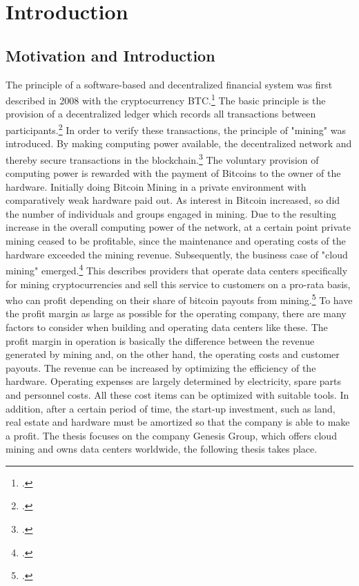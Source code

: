 \section{Introduction} \label{toc:einleitung}

\subsection{Motivation and Introduction} \label{toc:motivation}

The principle of a software-based and decentralized financial system was first described in 2008 with the cryptocurrency \ac{BTC}.\footcite[Cf.][]{nakamoto2008bitcoin}
The basic principle is the provision of a decentralized ledger
which records all transactions between participants.\footcite[Cf.][]{badertscher2017bitcoin} In order to verify these transactions,
the principle of "mining" was introduced. By making computing power available, the decentralized 
network and thereby secure transactions in the blockchain.\footcite[Cf.][]{kroll2013economics} The voluntary provision of
computing power is rewarded with the payment of Bitcoins to the owner of the hardware. Initially doing Bitcoin
Mining in a private environment with comparatively weak hardware paid out. As interest in Bitcoin increased, so did the number of
individuals and groups engaged in mining. Due to the resulting increase in the overall computing power of the network, at a certain point
private mining ceased to be profitable, since the maintenance and operating costs of the hardware
exceeded the mining revenue. Subsequently, the business case of "cloud mining" emerged.\footcite[Cf.][]{taylor2017evolution} This describes
providers that operate data centers specifically for mining cryptocurrencies and sell this service to customers on a pro-rata basis,
who can profit depending on their share of bitcoin payouts from mining.\footcite[Cf.][chap. 3.4.5]{bhaskar2015bitcoin}
To have the profit margin as large as possible for the operating company, there are many factors to consider when building and operating
data centers like these. The profit margin in operation is basically the difference between the revenue generated by mining
and, on the other hand, the operating costs and customer payouts. The revenue can be increased by optimizing the efficiency of the hardware.
Operating expenses are largely determined by electricity, spare parts and personnel costs. All these cost items
can be optimized with suitable tools. In addition, after a certain period of time, the start-up investment, such as land, real estate and hardware
must be amortized so that the company is able to make a profit. The thesis focuses on the company Genesis Group,
which offers cloud mining and owns data centers worldwide, the following thesis takes place. 

